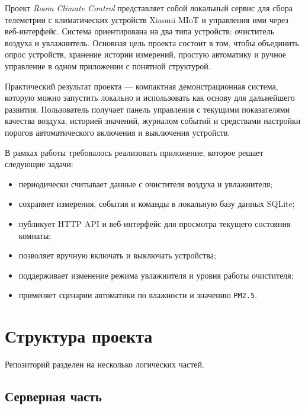 \documentclass[a4paper,article,14pt]{extarticle}
\begin{document}


\tableofcontents
\pagebreak


Проект \textit{Room Climate Control} представляет собой локальный сервис для сбора телеметрии с климатических устройств Xiaomi MIoT и управления ими через веб-интерфейс. Система ориентирована на два типа устройств: очиститель воздуха и увлажнитель. Основная цель проекта состоит в том, чтобы объединить опрос устройств, хранение истории измерений, простую автоматику и ручное управление в одном приложении с понятной структурой.

Практический результат проекта --- компактная демонстрационная система, которую можно запустить локально и использовать как основу для дальнейшего развития. Пользователь получает панель управления с текущими показателями качества воздуха, историей значений, журналом событий и средствами настройки порогов автоматического включения и выключения устройств.


В рамках работы требовалось реализовать приложение, которое решает следующие задачи:
\begin{itemize}
    \item периодически считывает данные с очистителя воздуха и увлажнителя;
    \item сохраняет измерения, события и команды в локальную базу данных SQLite;
    \item публикует HTTP API и веб-интерфейс для просмотра текущего состояния комнаты;
    \item позволяет вручную включать и выключать устройства;
    \item поддерживает изменение режима увлажнителя и уровня работы очистителя;
    \item применяет сценарии автоматики по влажности и значению \texttt{PM2.5}.
\end{itemize}

\section{Структура проекта}

Репозиторий разделен на несколько логических частей.

\subsection{Серверная часть}
\end{document}
